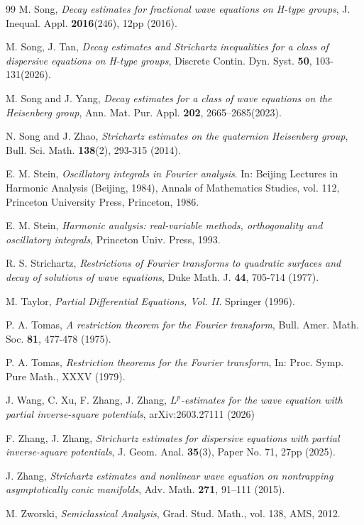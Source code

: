 \documentclass[a4paper,11pt, reqno]{amsart}
\numberwithin{equation}{section}
\theoremstyle{plain}
\theoremstyle{definition}
\theoremstyle{remark}
\begin{document}
\begin{thebibliography}{99}
 M. Song, \emph{Decay estimates for fractional wave equations on H-type groups}, J. Inequal. Appl. \textbf{2016}(246), 12pp (2016).

\label{Song-Tan} M. Song, J. Tan, \emph{Decay estimates and Strichartz inequalities for a class of dispersive equations on H-type groups}, Discrete Contin. Dyn. Syst. \textbf{50}, 103-131(2026).

M. Song and J. Yang, \emph{Decay estimates for a class of wave equations on the Heisenberg group}, Ann. Mat. Pur. Appl. \textbf{202}, 2665–2685(2023).


N. Song and  J. Zhao, \emph{Strichartz estimates on the quaternion Heisenberg group}, Bull. Sci. Math. \textbf{138}(2), 293-315 (2014).

 E. M. Stein,  \textit{Oscillatory integrals in Fourier analysis}.  In: Beijing Lectures in Harmonic Analysis (Beijing, 1984),  Annals of Mathematics Studies, vol. 112,  Princeton University Press, Princeton, 1986.

\label{S1993} E. M. Stein, \emph{Harmonic analysis: real-variable methods, orthogonality and oscillatory integrals}, Princeton Univ. Press, 1993.

\label{Str} R. S. Strichartz, \emph{Restrictions of Fourier transforms to quadratic surfaces and
	decay of solutions of wave equations}, Duke Math. J. \textbf{44}, 705-714 (1977).

 M. Taylor, \emph{Partial Differential Equations, Vol. II}. Springer (1996).

 P. A. Tomas,   \emph{A restriction theorem for the Fourier transform},  {Bull. Amer. Math. Soc.} \textbf{81}, 477-478 (1975).

 P. A. Tomas,   \emph{Restriction theorems for the Fourier transform},   In: Proc. Symp. Pure Math.,  XXXV (1979).

 J. Wang, C. Xu, F. Zhang, J. Zhang, \emph{$L^p$-estimates for the wave equation with partial inverse-square potentials}, arXiv:2603.27111 (2026)

\label{Zhang-Zhang} F. Zhang, J. Zhang, \emph{Strichartz estimates for dispersive equations with partial inverse-square potentials}, J. Geom. Anal. \textbf{35}(3), Paper No. 71, 27pp (2025).

 J. Zhang, \emph{Strichartz estimates and nonlinear wave equation on nontrapping asymptotically conic manifolds}, Adv. Math. \textbf{271}, 91–111 (2015).

 M. Zworski, \emph{Semiclassical Analysis}, Grad. Stud. Math., vol. 138, AMS, 2012.

	\end{thebibliography}
\end{document}

